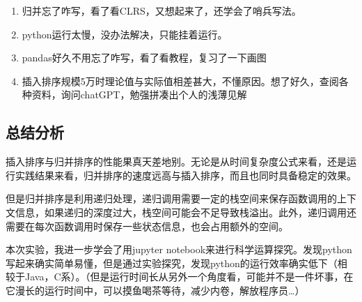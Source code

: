 \documentclass[11pt]{article}
\providecommand{\tightlist}{%
      \setlength{\itemsep}{0pt}\setlength{\parskip}{0pt}}
\begin{document}
\begin{enumerate}
\def\labelenumi{\arabic{enumi}.}
\tightlist
\item
  归并忘了咋写，看了看CLRS，又想起来了，还学会了哨兵写法。
\item
  python运行太慢，没办法解决，只能挂着运行。
\item
  pandas好久不用忘了咋写，看了看教程，复习了一下画图
\item
  插入排序规模5万时理论值与实际值相差甚大，不懂原因。想了好久，查阅各种资料，询问chatGPT，勉强拼凑出个人的浅薄见解
\end{enumerate}

\hypertarget{ux603bux7ed3ux5206ux6790}{%
\subsection{总结分析}\label{ux603bux7ed3ux5206ux6790}}

插入排序与归并排序的性能果真天差地别。无论是从时间复杂度公式来看，还是运行实践结果来看，归并排序的速度远高与插入排序，而且也同时具备稳定的效果。

但是归并排序是利用递归处理，递归调用需要一定的栈空间来保存函数调用的上下文信息，如果递归的深度过大，栈空间可能会不足导致栈溢出。此外，递归调用还需要在每次函数调用时保存一些状态信息，也会占用额外的空间。

本次实验，我进一步学会了用jupyter
notebook来进行科学运算探究。发现python写起来确实简单易懂，但是通过实验探究，发现python的运行效率确实低下（相较于Java，C系）。（但是运行时间长从另外一个角度看，可能并不是一件坏事，在它漫长的运行时间中，可以摸鱼喝茶等待，减少内卷，解放程序员\ldots）


    
    
    
\end{document}
